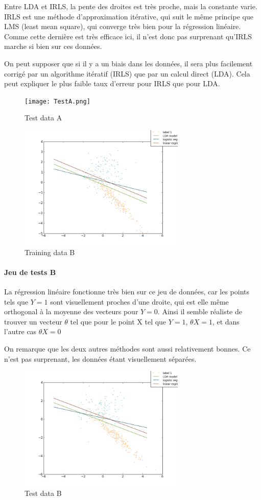 \documentclass{article}
\begin{document}
Entre LDA et IRLS, la pente des droites est très proche, mais la constante
varie. IRLS est une méthode d'approximation itérative, qui suit le même
principe que LMS (least mean square), qui converge très bien pour la
régression linéaire. Comme cette dernière est très efficace ici, il n'est donc
pas surprenant qu'IRLS marche si bien sur ces données.

On peut supposer que si il y a un biais dans les données, il sera plus
facilement corrigé par un algorithme itératif (IRLS) que par un calcul direct
(LDA). Cela peut expliquer le plus faible taux d'erreur pour IRLS que pour
LDA.

\begin{figure}[H]
\caption{Test data A}
\texttt{[image: TestA.png]}
\end{figure}

\begin{figure}[h]
\caption{Training data B}
\includegraphics[width=300px]{classificationB1.png}
\end{figure}

\paragraph{Jeu de tests B}

La régression linéaire fonctionne très bien sur ce jeu de données, car les
points tels que $Y = 1$ sont visuellement proches d'une droite, qui est elle
même orthogonal à la moyenne des vecteurs pour $Y = 0$. Ainsi il semble
réaliste de trouver un vecteur $\theta$ tel que pour le point X tel que $Y = 1$,
$\theta X = 1$, et dans l'autre cas $\theta X = 0$

On remarque que les deux autres méthodes sont aussi relativement bonnes. Ce
n'est pas surprenant, les données étant visuellement séparées.

\begin{figure}[H]
\caption{Test data B}
\includegraphics[width=300px]{classificationB1_test.png}
\end{figure}
\end{document}
